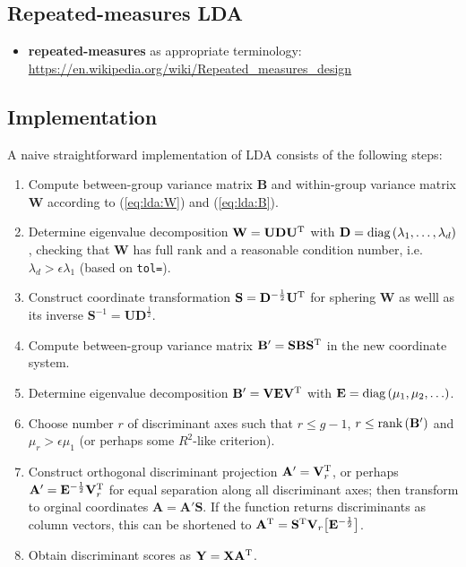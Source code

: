 \documentclass[a4paper]{article}
\begin{document}
\subsection{Repeated-measures LDA}
\label{sec:lda:repeated}

\begin{itemize}
\item \textbf{repeated-measures} as appropriate terminology: \url{https://en.wikipedia.org/wiki/Repeated_measures_design}
\end{itemize}

\subsection{Implementation}
\label{sec:lda:implement}

A naive straightforward implementation of LDA consists of the following steps:

\begin{enumerate}
\item Compute between-group variance matrix $\mathbf{B}$ and within-group variance matrix $\mathbf{W}$ according to (\ref{eq:lda:W}) and (\ref{eq:lda:B}).
\item Determine eigenvalue decomposition $\mathbf{W} = \mathbf{U} \mathbf{D} \mathbf{U}^{\text{T}}$ with $\mathbf{D} = \mathop{\text{diag}}\left(\lambda_1, \ldots, \lambda_d\right)$, checking that $\mathbf{W}$ has full rank and a reasonable condition number, i.e.\ $\lambda_d > \epsilon \lambda_1$ (based on \texttt{tol=}).
\item Construct coordinate transformation $\mathbf{S} = \mathbf{D}^{-\frac12} \mathbf{U}^{\text{T}}$ for sphering $\mathbf{W}$ as welll as its inverse $\mathbf{S}^{-1} = \mathbf{U} \mathbf{D}^{\frac12}$.
\item Compute between-group variance matrix $\mathbf{B}' = \mathbf{S} \mathbf{B} \mathbf{S}^{\text{T}}$ in the new coordinate system.
\item Determine eigenvalue decomposition $\mathbf{B}' = \mathbf{V} \mathbf{E} \mathbf{V}^{\text{T}}$ with $\mathbf{E} = \mathop{\text{diag}}\left(\mu_1, \mu_2, \ldots\right)$.
\item Choose number $r$ of discriminant axes such that $r\leq g-1$, $r\leq \mathop{\text{rank}}\left(\mathbf{B}'\right)$ and $\mu_r > \epsilon \mu_1$ (or perhaps some $R^2$-like criterion).
\item Construct orthogonal discriminant projection $\mathbf{A}' = \mathbf{V}_r^{\text{T}}$, or perhaps $\mathbf{A}' = \mathbf{E}^{-\frac12} \mathbf{V}_r^{\text{T}}$ for equal separation along all discriminant axes; then transform to orginal coordinates $\mathbf{A} = \mathbf{A}' \mathbf{S}$. If the function returns discriminants as column vectors, this can be shortened to $\mathbf{A}^{\text{T}} = \mathbf{S}^{\text{T}} \mathbf{V}_r \bigl[ \mathbf{E}^{-\frac12} \bigr]$.
\item Obtain discriminant scores as $\mathbf{Y} = \mathbf{X} \mathbf{A}^{\text{T}}$.
\end{enumerate}
\end{document}
